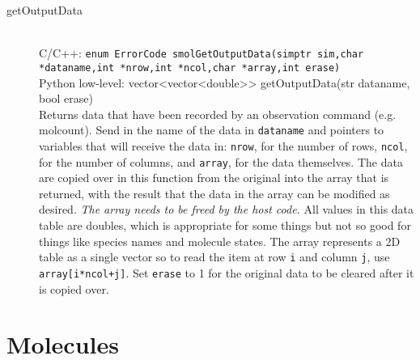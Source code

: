 \documentclass {book}
\newcommand {\ttt} {\texttt}
\begin{document}
\begin{description}
\item[getOutputData]
\hfill \\
C/C++: \ttt{enum ErrorCode smolGetOutputData(simptr sim,char *dataname,int *nrow,int *ncol,char *array,int erase)}\\
Python low-level: vector<vector<double>> getOutputData(str dataname, bool erase)\\
Returns data that have been recorded by an observation command (e.g. molcount). Send in the name of the data in \ttt{dataname} and pointers to variables that will receive the data in: \ttt{nrow}, for the number of rows, \ttt{ncol}, for the number of columns, and \ttt{array}, for the data themselves. The data are copied over in this function from the original into the array that is returned, with the result that the data in the array can be modified as desired. \textit{The array needs to be freed by the host code.} All values in this data table are doubles, which is appropriate for some things but not so good for things like species names and molecule states. The array represents a 2D table as a single vector so to read the item at row \ttt{i} and column \ttt{j}, use \ttt{array[i*ncol+j]}. Set \ttt{erase} to 1 for the original data to be cleared after it is copied over.

\end{description}

\section{Molecules}
\end{document}
